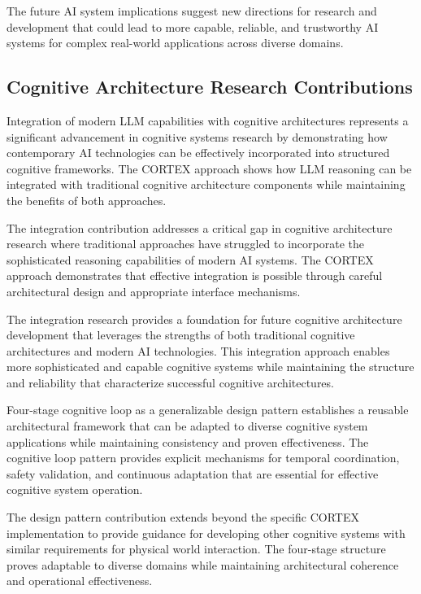 The future AI system implications suggest new directions for research and development that could lead to more capable, reliable, and trustworthy AI systems for complex real-world applications across diverse domains.

\subsection{Cognitive Architecture Research Contributions}

Integration of modern LLM capabilities with cognitive architectures represents a significant advancement in cognitive systems research by demonstrating how contemporary AI technologies can be effectively incorporated into structured cognitive frameworks. The CORTEX approach shows how LLM reasoning can be integrated with traditional cognitive architecture components while maintaining the benefits of both approaches.

The integration contribution addresses a critical gap in cognitive architecture research where traditional approaches have struggled to incorporate the sophisticated reasoning capabilities of modern AI systems. The CORTEX approach demonstrates that effective integration is possible through careful architectural design and appropriate interface mechanisms.

The integration research provides a foundation for future cognitive architecture development that leverages the strengths of both traditional cognitive architectures and modern AI technologies. This integration approach enables more sophisticated and capable cognitive systems while maintaining the structure and reliability that characterize successful cognitive architectures.

Four-stage cognitive loop as a generalizable design pattern establishes a reusable architectural framework that can be adapted to diverse cognitive system applications while maintaining consistency and proven effectiveness. The cognitive loop pattern provides explicit mechanisms for temporal coordination, safety validation, and continuous adaptation that are essential for effective cognitive system operation.

The design pattern contribution extends beyond the specific CORTEX implementation to provide guidance for developing other cognitive systems with similar requirements for physical world interaction. The four-stage structure proves adaptable to diverse domains while maintaining architectural coherence and operational effectiveness.

